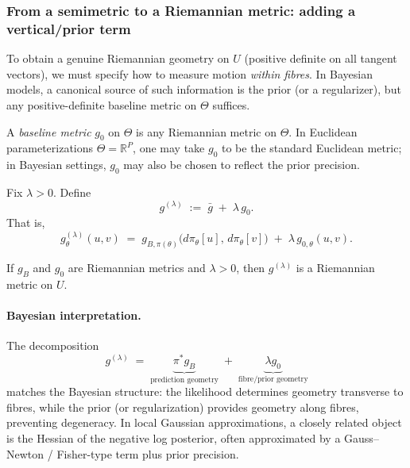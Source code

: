 \subsubsection{From a semimetric to a Riemannian metric: adding a vertical/prior term}

To obtain a genuine Riemannian geometry on $U$ (positive definite on all tangent vectors),
we must specify how to measure motion \emph{within fibres}.  In Bayesian models, a canonical
source of such information is the prior (or a regularizer), but any positive-definite baseline
metric on $\Theta$ suffices.

\begin{gdefn}
\label{def:baseline_metric}
A \emph{baseline metric} $g_0$ on $\Theta$ is any Riemannian metric on $\Theta$.
In Euclidean parameterizations $\Theta=\mathbb R^P$, one may take $g_0$ to be the standard
Euclidean metric; in Bayesian settings, $g_0$ may also be chosen to reflect the prior precision.
\end{gdefn}

\begin{gdefn}
\label{def:damped_metric}
Fix $\lambda>0$.  Define
\[
g^{(\lambda)} \;:=\; \bar g \;+\; \lambda\, g_0.
\]
That is,
\[
g^{(\lambda)}_\theta(u,v)
\;=\;
g_{B,\pi(\theta)}\!\bigl(d\pi_\theta[u],\,d\pi_\theta[v]\bigr)
\;+\;
\lambda\, g_{0,\theta}(u,v).
\]
\end{gdefn}

\begin{gprop}
\label{prop:damped_metric_pd}
If $g_B$ and $g_0$ are Riemannian metrics and $\lambda>0$, then $g^{(\lambda)}$ is a Riemannian metric on $U$.
\end{gprop}

\paragraph{Bayesian interpretation.}
The decomposition
\[
g^{(\lambda)} \;=\; \underbrace{\pi^\ast g_B}_{\text{prediction geometry}} \;+\;
\underbrace{\lambda g_0}_{\text{fibre/prior geometry}}
\]
matches the Bayesian structure:
the likelihood determines geometry transverse to fibres, while the prior (or regularization)
provides geometry along fibres, preventing degeneracy.  In local Gaussian approximations, a closely
related object is the Hessian of the negative log posterior, often approximated by a Gauss--Newton /
Fisher-type term plus prior precision.

